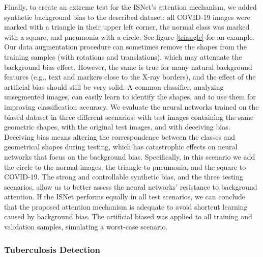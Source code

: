 \documentclass[fleqn,10pt]{wlscirep}
\begin{document}
{Finally, to create an extreme test for the ISNet's attention mechanism, we added synthetic background bias to the described dataset: all COVID-19 images were marked with a triangle in their upper left corner, the normal class was marked with a square, and pneumonia with a circle. See figure \ref{triangle} for an example. Our data augmentation procedure can sometimes remove the shapes from the training samples (with rotations and translations), which may attenuate the background bias effect. However, the same is true for many natural background features (e.g., text and markers close to the X-ray borders), and the effect of the artificial bias should still be very solid. A common classifier, analyzing unsegmented images, can easily learn to identify the shapes, and to use them for improving classification accuracy. We evaluate the neural networks trained on the biased dataset in three different scenarios: with test images containing the same geometric shapes, with the original test images, and with deceiving bias. Deceiving bias means altering the correspondence between the classes and geometrical shapes during testing, which has catastrophic effects on neural networks that focus on the background bias. Specifically, in this scenario we add the circle to the normal images, the triangle to pneumonia, and the square to COVID-19. The strong and controllable synthetic bias, and the three testing scenarios, allow us to better assess the neural networks' resistance to background attention. If the ISNet performs equally in all test scenarios, we can conclude that the proposed attention mechanism is adequate to avoid shortcut learning caused by background bias. The artificial biased was applied to all training and validation samples, simulating a worst-case scenario.

\subsubsection{Tuberculosis Detection}

}
\end{document}

